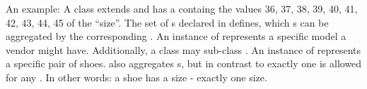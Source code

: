 An example: A class  extends  and has a  containg the values 36, 37, 38, 39, 40, 41, 42, 43, 44, 45 of the  ``size''.
The set of s declared in  defines, which s can be aggregated by the corresponding .
An instance of  represents a specific model a vendor might have.
Additionally, a class  may sub-class .
An instance of  represents a specific pair of shoes.
 also aggregates s, but in contrast to  exactly one  is allowed for any .
In other words: a shoe has a size - exactly one size.
\\


